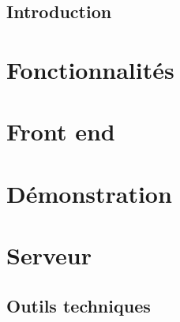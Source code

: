

\subsection{Introduction}


\section*{Fonctionnalités}
\subsection{}






\section*{Front end}
\subsection{}


\section*{Démonstration}


\section*{Serveur}


\subsection{Outils techniques}


